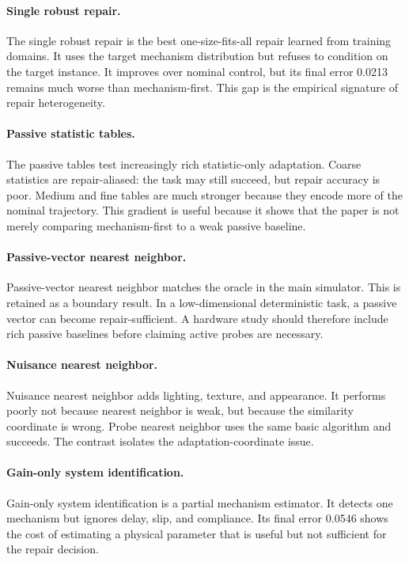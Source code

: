 \documentclass{article}
\begin{document}
\paragraph{Single robust repair.}
The single robust repair is the best one-size-fits-all repair learned from
training domains. It uses the target mechanism distribution but refuses to
condition on the target instance. It improves over nominal control, but its final
error 0.0213 remains much worse than mechanism-first. This gap is the empirical
signature of repair heterogeneity.

\paragraph{Passive statistic tables.}
The passive tables test increasingly rich statistic-only adaptation. Coarse
statistics are repair-aliased: the task may still succeed, but repair accuracy
is poor. Medium and fine tables are much stronger because they encode more of
the nominal trajectory. This gradient is useful because it shows that the paper
is not merely comparing mechanism-first to a weak passive baseline.

\paragraph{Passive-vector nearest neighbor.}
Passive-vector nearest neighbor matches the oracle in the main simulator. This
is retained as a boundary result. In a low-dimensional deterministic task, a
passive vector can become repair-sufficient. A hardware study should therefore
include rich passive baselines before claiming active probes are necessary.

\paragraph{Nuisance nearest neighbor.}
Nuisance nearest neighbor adds lighting, texture, and appearance. It performs
poorly not because nearest neighbor is weak, but because the similarity
coordinate is wrong. Probe nearest neighbor uses the same basic algorithm and
succeeds. The contrast isolates the adaptation-coordinate issue.

\paragraph{Gain-only system identification.}
Gain-only system identification is a partial mechanism estimator. It detects one
mechanism but ignores delay, slip, and compliance. Its final error 0.0546 shows
the cost of estimating a physical parameter that is useful but not sufficient
for the repair decision.
\end{document}
